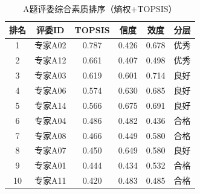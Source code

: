 \begin{table}[h]
\centering
\caption{A题评委综合素质排序（熵权+TOPSIS）}
\begin{tabular}{cccccc}
\hline
排名 & 评委ID & TOPSIS & 信度 & 效度 & 分层 \\
\hline
1 & 专家A02 & 0.787 & 0.426 & 0.678 & 优秀 \\
2 & 专家A12 & 0.661 & 0.407 & 0.498 & 优秀 \\
3 & 专家A03 & 0.619 & 0.601 & 0.714 & 良好 \\
4 & 专家A06 & 0.574 & 0.630 & 0.685 & 良好 \\
5 & 专家A14 & 0.566 & 0.675 & 0.691 & 良好 \\
6 & 专家A04 & 0.486 & 0.482 & 0.436 & 合格 \\
7 & 专家A08 & 0.466 & 0.449 & 0.580 & 合格 \\
8 & 专家A07 & 0.450 & 0.649 & 0.580 & 良好 \\
9 & 专家A01 & 0.444 & 0.434 & 0.532 & 合格 \\
10 & 专家A11 & 0.420 & 0.483 & 0.485 & 合格 \\
\hline
\end{tabular}
\end{table}